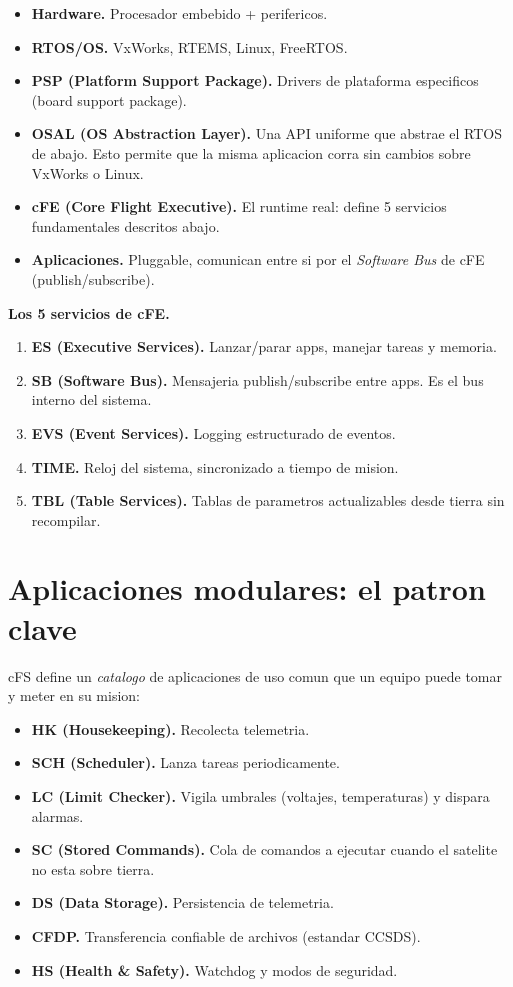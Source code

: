 \documentclass[11pt,a4paper,oneside,openright]{book}
\begin{document}
\begin{itemize}[leftmargin=2em]
  \item \textbf{Hardware.} Procesador embebido + perifericos.
  \item \textbf{RTOS/OS.} VxWorks, RTEMS, Linux, FreeRTOS.
  \item \textbf{PSP (Platform Support Package).} Drivers de
    plataforma especificos (board support package).
  \item \textbf{OSAL (OS Abstraction Layer).} Una API uniforme que
    abstrae el RTOS de abajo. Esto permite que la misma aplicacion
    corra sin cambios sobre VxWorks o Linux.
  \item \textbf{cFE (Core Flight Executive).} El runtime real: define
    5 servicios fundamentales descritos abajo.
  \item \textbf{Aplicaciones.} Pluggable, comunican entre si por el
    \emph{Software Bus} de cFE (publish/subscribe).
\end{itemize}

\textbf{Los 5 servicios de cFE.}

\begin{enumerate}[leftmargin=2em]
  \item \textbf{ES (Executive Services).} Lanzar/parar apps, manejar
    tareas y memoria.
  \item \textbf{SB (Software Bus).} Mensajeria publish/subscribe entre
    apps. Es el bus interno del sistema.
  \item \textbf{EVS (Event Services).} Logging estructurado de eventos.
  \item \textbf{TIME.} Reloj del sistema, sincronizado a tiempo de
    mision.
  \item \textbf{TBL (Table Services).} Tablas de parametros
    actualizables desde tierra sin recompilar.
\end{enumerate}

\section{Aplicaciones modulares: el patron clave}

cFS define un \emph{catalogo} de aplicaciones de uso comun que un
equipo puede tomar y meter en su mision:

\begin{itemize}[leftmargin=2em]
  \item \textbf{HK (Housekeeping).} Recolecta telemetria.
  \item \textbf{SCH (Scheduler).} Lanza tareas periodicamente.
  \item \textbf{LC (Limit Checker).} Vigila umbrales (voltajes,
    temperaturas) y dispara alarmas.
  \item \textbf{SC (Stored Commands).} Cola de comandos a ejecutar
    cuando el satelite no esta sobre tierra.
  \item \textbf{DS (Data Storage).} Persistencia de telemetria.
  \item \textbf{CFDP.} Transferencia confiable de archivos (estandar
    CCSDS).
  \item \textbf{HS (Health \& Safety).} Watchdog y modos de seguridad.
\end{itemize}
\end{document}
